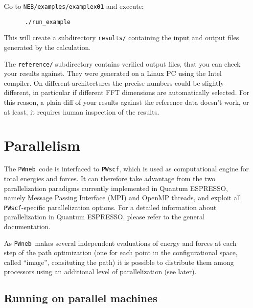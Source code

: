 \documentclass[12pt,a4paper]{article}
\def\qe{{\sc Quantum ESPRESSO}}
\def\NEB{\texttt{PWneb}} %
\def\PWscf{\texttt{PWscf}}
\begin{document}
Go to \texttt{NEB/examples/examplex01} and execute:
\begin{verbatim}
      ./run_example
\end{verbatim}
This will create a subdirectory \texttt{results/} containing the input and
output files generated by the calculation.

The \texttt{reference/} subdirectory contains
verified output files, that you can check your results against. They
were generated on a Linux PC using the Intel compiler. On different
architectures the precise numbers could be slightly different, in
particular if different FFT dimensions are automatically selected. For
this reason, a plain diff of your results against the reference data
doesn't work, or at least, it requires human inspection of the
results.

\section{Parallelism}
\label{Sec:para}

The \NEB\ code is interfaced to \PWscf, which is used as computational engine 
for total energies and forces. It can therefore take advantage from the two 
parallelization paradigms currently implemented in \qe, namely
  Message Passing Interface (MPI) and OpenMP threads, and exploit
all \PWscf-specific parallelization options.
For a detailed information about parallelization in \qe, 
please refer to the general documentation.

As \NEB \ makes several independent evaluations of energy and forces at each step of
the path optimization (one for each point in the configurational space,
 called ``image'', consituting the path)
 it is possible to distribute them among processors using an additional level of 
parallelization (see later).

\subsection{Running on parallel machines}
\label{SubSec:para}
\end{document}
